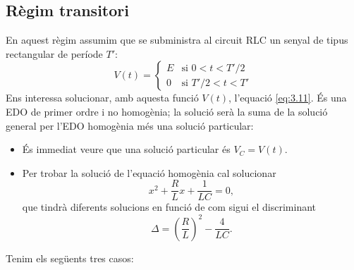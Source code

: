 \documentclass[a4paper,10.5pt]{report}
\begin{document}
\subsection{Règim transitori}
En aquest règim assumim que se subministra al circuit RLC un senyal de tipus rectangular de període $T'$:
\begin{equation}
	V(t) = 
	\begin{cases}
		E & \text{si } 0 < t < T'/2 \\
		0 & \text{si } T'/2 < t < T' \label{eq:3.20}
	\end{cases}
\end{equation}
Ens interessa solucionar, amb aquesta funció $V(t)$, l'equació \eqref{eq:3.11}. És una EDO de primer ordre i no homogènia; la solució serà la suma de la solució general per l'EDO homogènia més una solució particular:
\begin{itemize}
	\item És immediat veure que una solució particular és $V_C = V(t)$.
	\item Per trobar la solució de l'equació homogènia cal solucionar
	\begin{equation}
		x^2 + \frac{R}{L}x + \frac{1}{LC} = 0, \label{eq:3.21}
	\end{equation}
	que tindrà diferents solucions en funció de com sigui el discriminant
	\begin{equation}
		\Delta = \left(\frac{R}{L}\right)^2-\frac{4}{LC}.
	\end{equation}
\end{itemize}
Tenim els següents tres casos:
\end{document}
